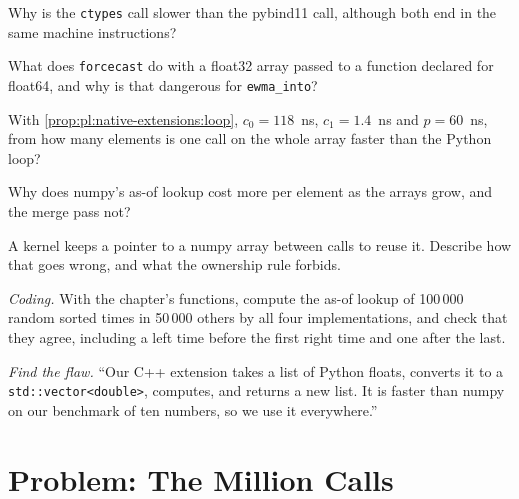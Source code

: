 \begin{exercise}[$\star$]\label{exo:pl:native-extensions:2}
Why is the \texttt{ctypes} call slower than the pybind11 call, although both end in the same machine instructions?
\end{exercise}

\begin{exercise}[$\star$]\label{exo:pl:native-extensions:3}
What does \texttt{forcecast} do with a float32 array passed to a function declared for float64, and why is that dangerous for
\texttt{ewma\_into}?
\end{exercise}

\begin{exercise}[$\star\star$]\label{exo:pl:native-extensions:4}
With \cref{prop:pl:native-extensions:loop}, $c_0 = 118$~ns, $c_1 = 1.4$~ns and $p = 60$~ns, from how many elements is one call on the
whole array faster than the Python loop?
\end{exercise}

\begin{exercise}[$\star\star$]\label{exo:pl:native-extensions:5}
Why does numpy's as-of lookup cost more per element as the arrays grow, and the merge pass not?
\end{exercise}

\begin{exercise}[$\star\star$]\label{exo:pl:native-extensions:6}
A kernel keeps a pointer to a numpy array between calls to reuse it. Describe how that goes wrong, and what the ownership rule forbids.
\end{exercise}

\begin{exercise}[$\star\star\star$]\label{exo:pl:native-extensions:7}
\emph{Coding.} With the chapter's functions, compute the as-of lookup of 100\,000 random sorted times in 50\,000 others by all four
implementations, and check that they agree, including a left time before the first right time and one after the last.
\end{exercise}

\begin{exercise}[$\star\star\star$]\label{exo:pl:native-extensions:8}
\emph{Find the flaw.} ``Our C++ extension takes a list of Python floats, converts it to a \texttt{std::vector<double>}, computes, and
returns a new list. It is faster than numpy on our benchmark of ten numbers, so we use it everywhere.''
\end{exercise}

\section{Problem: The Million Calls}


